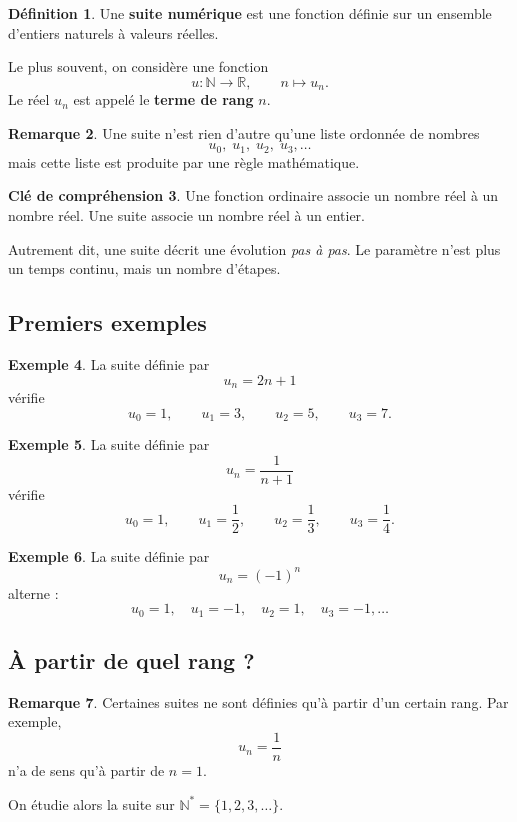 \documentclass[11pt,a4paper]{article}
\theoremstyle{definition}
\newtheorem{definition}{Définition}[section]
\newtheorem{exemple}[definition]{Exemple}
\newtheorem{remarque}[definition]{Remarque}
\newtheorem{interpretation}[definition]{Clé de compréhension}
\theoremstyle{plain}
\theoremstyle{remark}
\newcommand{\R}{\mathbb{R}}
\newcommand{\N}{\mathbb{N}}
\begin{document}
\begin{definition}
Une \textbf{suite numérique} est une fonction définie sur un ensemble d'entiers naturels à valeurs réelles.

Le plus souvent, on considère une fonction
\[
u:\N\to\R,\qquad n\mapsto u_n.
\]
Le réel $u_n$ est appelé le \textbf{terme de rang} $n$.
\end{definition}

\begin{remarque}
Une suite n'est rien d'autre qu'une liste ordonnée de nombres
\[
u_0,\;u_1,\;u_2,\;u_3,\dots
\]
mais cette liste est produite par une règle mathématique.
\end{remarque}

\begin{interpretation}
Une fonction ordinaire associe un nombre réel à un nombre réel.  
Une suite associe un nombre réel à un entier.  

Autrement dit, une suite décrit une évolution \emph{pas à pas}. Le paramètre n'est plus un temps continu, mais un nombre d'étapes.
\end{interpretation}

\subsection{Premiers exemples}

\begin{exemple}
La suite définie par
\[
u_n=2n+1
\]
vérifie
\[
u_0=1,\qquad u_1=3,\qquad u_2=5,\qquad u_3=7.
\]
\end{exemple}

\begin{exemple}
La suite définie par
\[
u_n=\frac1{n+1}
\]
vérifie
\[
u_0=1,\qquad u_1=\frac12,\qquad u_2=\frac13,\qquad u_3=\frac14.
\]
\end{exemple}

\begin{exemple}
La suite définie par
\[
u_n=(-1)^n
\]
alterne :
\[
u_0=1,\quad u_1=-1,\quad u_2=1,\quad u_3=-1,\dots
\]
\end{exemple}

\subsection{À partir de quel rang ?}

\begin{remarque}
Certaines suites ne sont définies qu'à partir d'un certain rang. Par exemple,
\[
u_n=\frac1n
\]
n'a de sens qu'à partir de $n=1$.

On étudie alors la suite sur $\N^*=\{1,2,3,\dots\}$.
\end{remarque}
\end{document}
